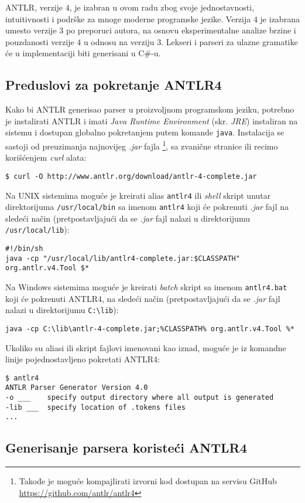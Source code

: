 ANTLR, verzije $4$, je izabran u ovom radu zbog svoje jednostavnosti, intuitivnosti i podrške za mnoge moderne programske jezike. Verzija $4$ je izabrana umesto verzije $3$ po preporuci autora, na osnovu eksperimentalne analize brzine i pouzdanosti verzije $4$ u odnosu na verziju $3$. Lekseri i parseri za ulazne gramatike će u implementaciji biti generisani u C\#-u.


\subsection{Preduslovi za pokretanje ANTLR4}
\label{subsec:ANTLRInstallation}

Kako bi ANTLR generisao parser u proizvoljnom programskom jeziku, potrebno je instalirati ANTLR i imati \emph{Java Runtime Environment} (skr. \emph{JRE}) instaliran na sistemu i dostupan globalno pokretanjem putem komande \texttt{java}. Instalacija se sastoji od preuzimanja najnovijeg \emph{.jar} fajla
\footnote{Takođe je moguće kompajlirati izvorni kod dostupan na servisu GitHub \url{https://github.com/antlr/antlr4}}, sa zvanične stranice \cite{ANTLR} ili recimo korišćenjem \emph{curl} alata: 
\begin{lstlisting}[language={}]
$ curl -O http://www.antlr.org/download/antlr-4-complete.jar
\end{lstlisting}

Na UNIX sistemima moguće je kreirati alias \texttt{antlr4} ili \emph{shell} skript unutar direktorijuma \texttt{/usr/local/bin} sa imenom \texttt{antlr4} koji će pokrenuti \emph{.jar} fajl na sledeći način (pretpostavljajući da se \emph{.jar} fajl nalazi u direktorijumu \texttt{/usr/local/lib}):
\begin{lstlisting}[language={}]
#!/bin/sh
java -cp "/usr/local/lib/antlr4-complete.jar:$CLASSPATH" org.antlr.v4.Tool $*
\end{lstlisting}

Na Windows sistemima moguće je kreirati \emph{batch} skript sa imenom \texttt{antlr4.bat} koji će pokrenuti ANTLR4, na sledeći način (pretpostavljajući da se \emph{.jar} fajl nalazi u direktorijumu \texttt{C:\textbackslash{}lib}):
\begin{lstlisting}[language={}]
java -cp C:\lib\antlr-4-complete.jar;%CLASSPATH% org.antlr.v4.Tool %*
\end{lstlisting}

Ukoliko su aliasi ili skript fajlovi imenovani kao iznad, moguće je iz komandne linije pojednostavljeno pokretati ANTLR4:  
\begin{lstlisting}[language={}]
$ antlr4
ANTLR Parser Generator Version 4.0
-o ___    specify output directory where all output is generated
-lib ___  specify location of .tokens files
...
\end{lstlisting}


\subsection{Generisanje parsera koristeći ANTLR4}
\label{subsec:ANTLRParserGeneration}

